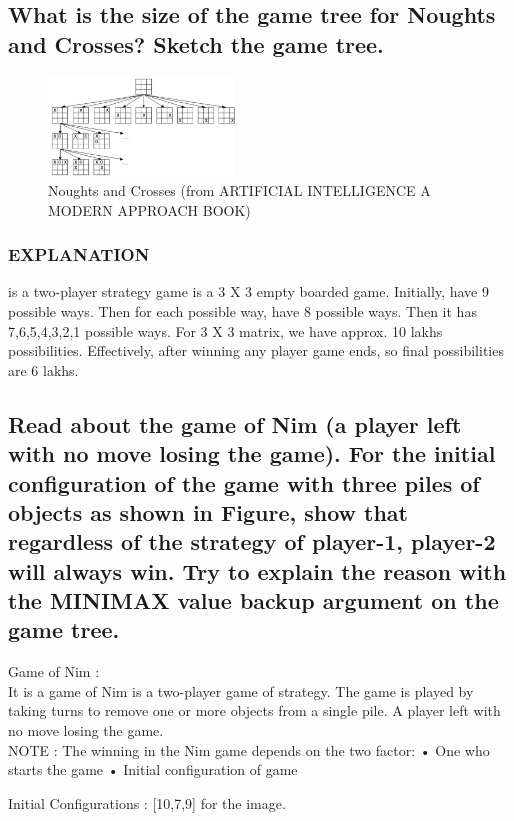 \documentclass[15pt,journal]{IEEEtran}
\begin{document}
\subsection{ What is the size of the game tree for Noughts and Crosses? Sketch the game tree.
}
\begin{figure}[H]%
\begin {center}
\includegraphics[width=0.45\textwidth]{image/tic tak toe.jpg}
\caption{Noughts and Crosses  (from  ARTIFICIAL INTELLIGENCE A MODERN APPROACH BOOK)} %
\label{fig:ecg}
\end {center}
\end{figure}
\subsubsection{\Large{\textbf{EXPLANATION}}\\}
is a two-player strategy game
is a 3 X 3 empty boarded game.
Initially, have 9 possible ways.
Then for each possible way, have 8 possible ways.
Then it has 7,6,5,4,3,2,1 possible ways.
For 3 X 3 matrix, we have approx. 10 lakhs possibilities.
Effectively, after winning any player game ends, so final possibilities are 6 lakhs.
\subsection{Read about the game of Nim (a player left with no move losing the game). For the initial configuration of the game with three piles of objects as shown in Figure, show that regardless of the strategy of player-1, player-2 will always win. Try to explain the reason with the MINIMAX value backup argument on the game tree.
}
Game of Nim :\\
It is a game of Nim is a two-player game of strategy.
The game is played by taking turns to remove one or more objects                                 from a single pile. A player left with no move losing the game.\\
NOTE  : 
      The winning in the Nim game depends on the two factor: 
      • One who starts the game 
      • Initial configuration of game

Initial Configurations : [10,7,9] for the image.
\end{document}
